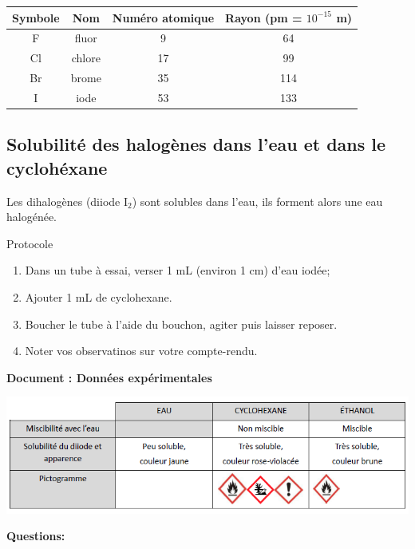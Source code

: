 \documentclass[french]{article}
\begin{document}
\begin{table}[ht]
	\centering
	\begin{tabular}{|c|c|c|c|}
		\hline
		\hspace{0.5cm}\textbf{Symbole} \hspace{0.5cm} & \hspace{1cm}\textbf{Nom} \hspace{1cm} & \textbf{Numéro atomique}& \textbf{Rayon} (pm = $10^{-15}$ m) \hfill \\ \hline
		 F & fluor & 9 & 64\\ \hline
		 Cl& chlore & 17 & 99 \\ \hline 
		 Br& brome & 35 & 114 \\ \hline
		 I & iode & 53 & 133 \\ \hline 
	\end{tabular}
\end{table}

\subsection{Solubilité des halogènes dans l'eau et dans le cyclohéxane}

Les dihalogènes (diiode I$_2$) sont solubles dans l'eau, ils forment alors une eau halogénée. 

\begin{Protocol}{Protocole}
\begin{enumerate}
	\item Dans un tube à essai, verser 1 mL (environ 1 cm) d'eau iodée;
	\item Ajouter 1 mL de cyclohexane. 
	\item Boucher le tube à l'aide du bouchon, agiter puis laisser reposer.
	\item Noter vos observatinos sur votre compte-rendu.
\end{enumerate}
\end{Protocol}

\begin{mdframed}[style=doc, leftmargin=0pt, rightmargin=0pt, innertopmargin=8pt, innerbottommargin=8pt, innerrightmargin=10pt, innerleftmargin=10pt]
\noindent \textbf{Document : Données expérimentales}

\centering
\includegraphics[width=1\textwidth]{DonneesExp.png}
\end{mdframed}
\textbf{Questions:}
\end{document}
